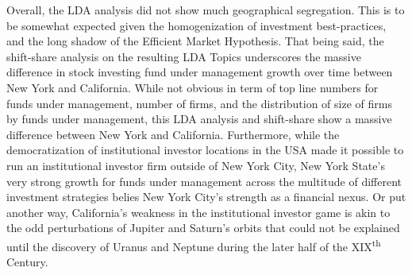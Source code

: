 Overall, the LDA analysis did not show much geographical segregation.  This is to be somewhat expected given the homogenization of investment best-practices, and the long shadow of the Efficient Market Hypothesis.  That being said, the shift-share analysis on the resulting LDA Topics underscores the massive difference in stock investing fund under management growth over time between New York and California. While not obvious in term of top line numbers for funds under management, number of firms, and the distribution of size of firms by funds under management, this LDA analysis and shift-share show a massive difference between New York and California. Furthermore, while the democratization of institutional investor locations in the USA made it possible to run an institutional investor firm outside of New York City, New York State's very strong growth for funds under management across the multitude of different investment strategies belies New York City's strength as a financial nexus.  Or put another way, California's weakness in the institutional investor game is akin to the odd perturbations of Jupiter and Saturn's orbits that could not be explained until the discovery of Uranus and Neptune during the later half of the XIX\textsuperscript{th} Century.  


